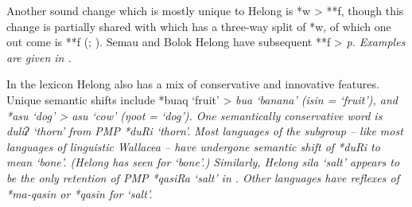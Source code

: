 Another sound change which is mostly unique
to Helong is *w > **f, though this change is partially
shared with  which has a three-way
split of *w, of which one out come is **f (; \citealp[82ff]{Edwards2021}).
Semau and Bolok Helong have subsequent **f > \it{p}.
Examples are given in .


In the lexicon Helong also has a mix of conservative
and innovative features.
Unique semantic shifts include *buaq ‘fruit’ > \it{bua} ‘banana’
(\it{isin} = ‘fruit’), and *asu ‘dog’ > \it{asu} ‘cow’ (\it{ŋoot} = ‘dog’).
One semantically conservative word is \it{duliʔ} ‘thorn’ from PMP *duRi ‘thorn’.
Most languages of the  subgroup -- like most
languages of linguistic Wallacea -- have undergone semantic
shift of *duRi to mean ‘bone’.
(Helong has \it{seen} for ‘bone’.) Similarly,
Helong \it{sila} ‘salt’ appears to be the only retention of PMP
*qasiRa ‘salt’ in .
Other  languages have reflexes of *ma-qasin
or *qasin for ‘salt’.